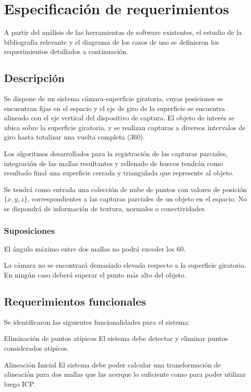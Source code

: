 \section{Especificación de requerimientos}
A partir del análisis de las herramientas de software existentes,
el estudio de la bibliografía relevante y el diagrama de los casos de uso
se definieron los requerimientos detallados a continuación.

\subsection{Descripción}
	Se dispone de un sistema cámara-superficie giratoria, cuyas posiciones
	se encuentran fijas en el espacio y el eje de giro de la superficie se
	encuentra alineado con el eje vertical del dispositivo de captura.
	El objeto de interés se ubica sobre la superficie giratoria, y se
	realizan capturas a diversos intervalos de giro
	hasta totalizar una vuelta completa (360\textdegree).

	Los algoritmos desarrollados para la registración de las capturas parciales,
	integración de las mallas resultantes y rellenado de huecos tendrán como resultado final
	una superficie cerrada y triangulada que represente al objeto.

	Se tendrá como entrada una colección de nube de puntos
	con valores de posición $\{x, y, z\}$,
	correspondientes a las capturas parciales de un objeto en el espacio.
	No se dispondrá de información de textura, normales o conectividades.

	\subsubsection{Suposiciones}
		El ángulo máximo entre dos mallas no podrá exceder los 60\textdegree.

		La cámara no se encontrará demasiado elevada respecto a la
		superficie giratoria. En ningún caso deberá superar el punto más alto del objeto.

\subsection{Requerimientos funcionales}
Se identificaron las siguientes funcionalidades para el sistema:

	\Requerimiento
		{Eliminación de puntos atípicos}
		{El sistema debe detectar y eliminar puntos considerados atípicos.}

	\Requerimiento
		{Alineación Inicial}
		{El sistema debe poder calcular una transformación de alineación para dos mallas
		que las acerque lo suficiente como para poder utilizar luego ICP.}

